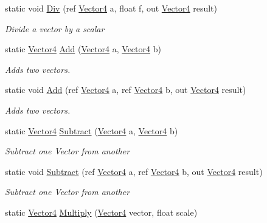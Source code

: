 \begin{DoxyCompactItemize}
static void \hyperlink{struct_open_t_k_1_1_vector4_a270900048834c2172f97ef7a8f733ea1}{Div} (ref \hyperlink{struct_open_t_k_1_1_vector4}{Vector4} a, float f, out \hyperlink{struct_open_t_k_1_1_vector4}{Vector4} result)
\begin{DoxyCompactList}\small\item\em Divide a vector by a scalar \end{DoxyCompactList}\item 
static \hyperlink{struct_open_t_k_1_1_vector4}{Vector4} \hyperlink{struct_open_t_k_1_1_vector4_a6ec8531c71de1432811088523d9400dc}{Add} (\hyperlink{struct_open_t_k_1_1_vector4}{Vector4} a, \hyperlink{struct_open_t_k_1_1_vector4}{Vector4} b)
\begin{DoxyCompactList}\small\item\em Adds two vectors. \end{DoxyCompactList}\item 
static void \hyperlink{struct_open_t_k_1_1_vector4_ad477d2f91afbcbbfec7a88ff6f92a66d}{Add} (ref \hyperlink{struct_open_t_k_1_1_vector4}{Vector4} a, ref \hyperlink{struct_open_t_k_1_1_vector4}{Vector4} b, out \hyperlink{struct_open_t_k_1_1_vector4}{Vector4} result)
\begin{DoxyCompactList}\small\item\em Adds two vectors. \end{DoxyCompactList}\item 
static \hyperlink{struct_open_t_k_1_1_vector4}{Vector4} \hyperlink{struct_open_t_k_1_1_vector4_adbfd92237b4b8262a1c0024e9164c8ce}{Subtract} (\hyperlink{struct_open_t_k_1_1_vector4}{Vector4} a, \hyperlink{struct_open_t_k_1_1_vector4}{Vector4} b)
\begin{DoxyCompactList}\small\item\em Subtract one Vector from another \end{DoxyCompactList}\item 
static void \hyperlink{struct_open_t_k_1_1_vector4_a61db8005cbfe72d83a9d397d025efe8d}{Subtract} (ref \hyperlink{struct_open_t_k_1_1_vector4}{Vector4} a, ref \hyperlink{struct_open_t_k_1_1_vector4}{Vector4} b, out \hyperlink{struct_open_t_k_1_1_vector4}{Vector4} result)
\begin{DoxyCompactList}\small\item\em Subtract one Vector from another \end{DoxyCompactList}\item 
static \hyperlink{struct_open_t_k_1_1_vector4}{Vector4} \hyperlink{struct_open_t_k_1_1_vector4_a6b0e865a1f6f16d6053e4ab082baee3b}{Multiply} (\hyperlink{struct_open_t_k_1_1_vector4}{Vector4} vector, float scale)

\end{DoxyCompactItemize}
